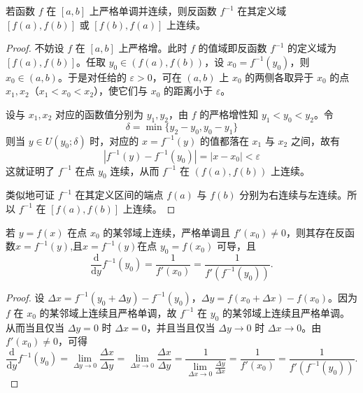 \documentclass[../../main.tex]{subfiles}%
\begin{document}
\begin{theorem}[反函数连续定理]\label{theorem:反函数连续定理}
若函数 \( f \) 在 \([a, b]\) 上严格单调并连续，则反函数 \( f^{-1} \) 在其定义域 \([f(a), f(b)]\) 或 \([f(b), f(a)]\) 上连续。
\end{theorem}
\begin{proof}
不妨设 \( f \) 在 \([a, b]\) 上严格增。此时 \( f \) 的值域即反函数 \( f^{-1} \) 的定义域为 \([f(a), f(b)]\)。任取 \( y_0 \in (f(a), f(b)) \)，设 \( x_0 = f^{-1}(y_0) \)，则 \( x_0 \in (a, b) \)。于是对任给的 \( \varepsilon > 0 \)，可在 \( (a, b) \) 上 \( x_0 \) 的两侧各取异于 \( x_0 \) 的点 \( x_1, x_2 \)（\( x_1 < x_0 < x_2 \)），使它们与 \( x_0 \) 的距离小于 \( \varepsilon \)。

设与 \( x_1, x_2 \) 对应的函数值分别为 \( y_1, y_2 \)，由 \( f \) 的严格增性知 \( y_1 < y_0 < y_2 \)。令
\[
\delta = \min\{ y_2 - y_0, y_0 - y_1 \}
\]
则当 \( y \in U(y_0; \delta) \) 时，对应的 \( x = f^{-1}(y) \) 的值都落在 \( x_1 \) 与 \( x_2 \) 之间，故有
\[
| f^{-1}(y) - f^{-1}(y_0) | = | x - x_0 | < \varepsilon
\]
这就证明了 \( f^{-1} \) 在点 \( y_0 \) 连续，从而 \( f^{-1} \) 在 \( (f(a), f(b)) \) 上连续。

类似地可证 \( f^{-1} \) 在其定义区间的端点 \( f(a) \) 与 \( f(b) \) 分别为右连续与左连续。所以 \( f^{-1} \) 在 \([f(a), f(b)]\) 上连续。
\end{proof}

\begin{theorem}[反函数求导定理]\label{theorem:反函数求导定理}
若 \( y=f(x) \) 在点 \( x_0 \) 的某邻域上连续，严格单调且 \( f'(x_0) \neq 0 \)，则其存在反函数$x=f^{-1}(y)$,且$x=f^{-1}(y)$在点 \(y_0=f(x_0) \) 可导，且
\[
\frac{\mathrm{d}}{\mathrm{d}y}f^{-1}\left( y_0 \right) =\frac{1}{f' \left( x_0 \right)}=\frac{1}{f' \left( f^{-1}\left( y_0 \right) \right)}.
\]
\end{theorem}
\begin{proof}
设 \( \Delta x = f^{-1}(y_0 + \Delta y) - f^{-1}(y_0) \)，\( \Delta y = f(x_0 + \Delta x) - f(x_0) \)。因为 \(f \) 在 \( x_0 \) 的某邻域上连续且严格单调，故 \( f^{-1}\) 在 \( y_0 \) 的某邻域上连续且严格单调。从而当且仅当 \( \Delta y = 0 \) 时 \( \Delta x = 0 \)，并且当且仅当 \( \Delta y \to 0 \) 时 \( \Delta x \to 0 \)。由 \( f'(x_0) \neq 0 \)，可得
\[
\frac{\mathrm{d}}{\mathrm{d}y}f^{-1}\left( y_0 \right) =\lim_{\Delta y\rightarrow 0} \frac{\Delta x}{\Delta y}=\lim_{\Delta x\rightarrow 0} \frac{\Delta x}{\Delta y}=\frac{1}{\lim\limits_{\Delta x\rightarrow 0} \frac{\Delta y}{\Delta x}}=\frac{1}{f' \left( x_0 \right)}=\frac{1}{f' \left( f^{-1}\left( y_0 \right) \right)}.
\]\end{proof}
\end{document}
